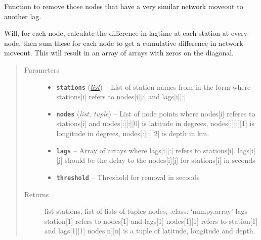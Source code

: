 \documentclass[a4paper,10pt,english]{sphinxmanual}
\begin{document}

\begin{fulllineitems}
\label{modules:bright_lights._rm_similarlags}
Function to remove those nodes that have a very similar network moveout
to another lag.

Will, for each node, calculate the difference in lagtime at each station
at every node, then sum these for each node to get a cumulative difference
in network moveout.  This will result in an array of arrays with zeros on
the diagonal.
\begin{quote}\begin{description}
\item[{Parameters}] \leavevmode\begin{itemize}
\item {} 
\textbf{\texttt{stations}} (\href{https://docs.python.org/library/functions.html\#list}{\emph{list}}) -- List of station names from in the form where stations{[}i{]}    refers to nodes{[}i{]}{[}:{]} and lags{[}i{]}{[}:{]}

\item {} 
\textbf{\texttt{nodes}} (\emph{list, tuple}) -- List of node points where nodes{[}i{]} referes to stations{[}i{]} and    nodes{[}:{]}{[}:{]}{[}0{]} is latitude in degrees, nodes{[}:{]}{[}:{]}{[}1{]} is longitude in    degrees, nodes{[}:{]}{[}:{]}{[}2{]} is depth in km.

\item {} 
\textbf{\texttt{lags}} -- Array of arrays where lags{[}i{]}{[}:{]} refers to stations{[}i{]}.    lags{[}i{]}{[}j{]} should be the delay to the nodes{[}i{]}{[}j{]} for stations{[}i{]} in seconds

\item {} 
\textbf{\texttt{threshold}} -- Threshold for removal in seconds

\end{itemize}

\item[{Returns}] \leavevmode
list stations, list of lists of tuples nodes, :class:     `numpy.array' lags station{[}1{]} refers to nodes{[}1{]} and lags{[}1{]}    nodes{[}1{]}{[}1{]} refers to station{[}1{]} and lags{[}1{]}{[}1{]}    nodes{[}n{]}{[}n{]} is a tuple of latitude, longitude and depth.

\end{description}\end{quote}

\end{fulllineitems}
\end{document}
